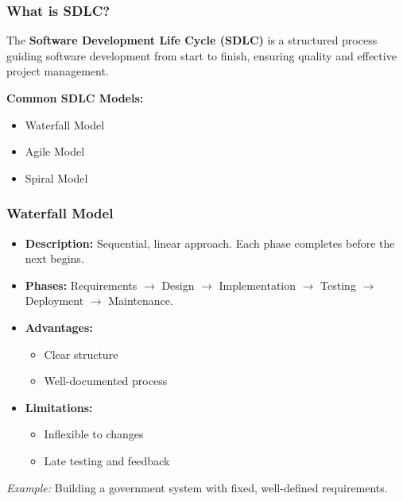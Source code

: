 \documentclass{beamer}
\begin{document}
\begin{frame}[fragile]
  \frametitle{What is SDLC?}
  The \textbf{Software Development Life Cycle (SDLC)} is a structured process guiding software development from start to finish, ensuring quality and effective project management.
  
  \textbf{Common SDLC Models:}
  \begin{itemize}
    \item Waterfall Model
    \item Agile Model
    \item Spiral Model
  \end{itemize}
\end{frame}

\begin{frame}[fragile]
  \frametitle{Waterfall Model}
  \begin{itemize}
    \item \textbf{Description:} Sequential, linear approach. Each phase completes before the next begins.
    \item \textbf{Phases:} Requirements $\rightarrow$ Design $\rightarrow$ Implementation $\rightarrow$ Testing $\rightarrow$ Deployment $\rightarrow$ Maintenance.
    \item \textbf{Advantages:}
    \begin{itemize}
      \item Clear structure
      \item Well-documented process
    \end{itemize}
    \item \textbf{Limitations:}
    \begin{itemize}
      \item Inflexible to changes
      \item Late testing and feedback
    \end{itemize}
  \end{itemize}
  
  \textit{Example:} Building a government system with fixed, well-defined requirements.
\end{frame}
\end{document}
